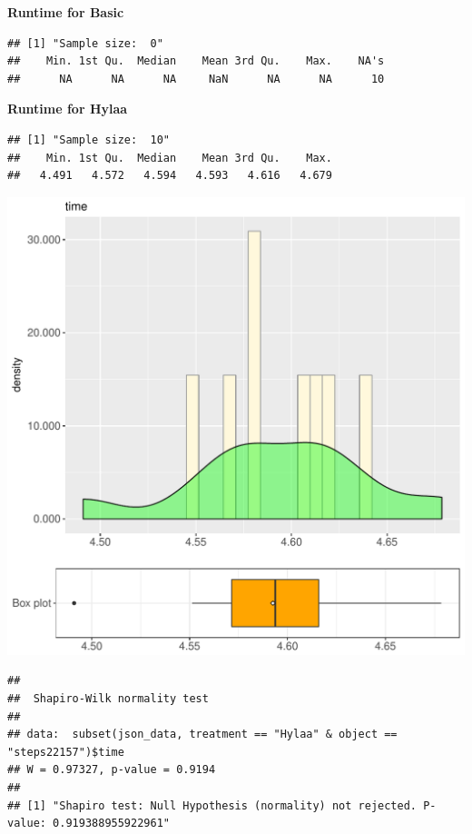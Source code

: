 \documentclass{article}\usepackage[]{graphicx}\usepackage[]{color}
\makeatletter
\def\maxwidth{ %
  \ifdim\Gin@nat@width>\linewidth
    \linewidth
  \else
    \Gin@nat@width
  \fi
}
\newenvironment{kframe}{%
 \def\at@end@of@kframe{}%
 \ifinner\ifhmode%
  \def\at@end@of@kframe{\end{minipage}}%
  \begin{minipage}{\columnwidth}%
 \fi\fi%
 \def\FrameCommand##1{\hskip\@totalleftmargin \hskip-\fboxsep
 \colorbox{shadecolor}{##1}\hskip-\fboxsep
     \hskip-\linewidth \hskip-\@totalleftmargin \hskip\columnwidth}%
 \MakeFramed {\advance\hsize-\width
   \@totalleftmargin\z@ \linewidth\hsize
   \@setminipage}}%
 {\par\unskip\endMakeFramed%
 \at@end@of@kframe}
\newenvironment{knitrout}{}{} %
\makeatother
\begin{document}
 \textbf{Runtime for Basic}
\begin{knitrout}
\color{fgcolor}\begin{kframe}
\begin{verbatim}
## [1] "Sample size:  0"
##    Min. 1st Qu.  Median    Mean 3rd Qu.    Max.    NA's 
##      NA      NA      NA     NaN      NA      NA      10
\end{verbatim}
\end{kframe}
\end{knitrout}
 \textbf{Runtime for Hylaa}
\begin{knitrout}
\color{fgcolor}\begin{kframe}
\begin{verbatim}
## [1] "Sample size:  10"
##    Min. 1st Qu.  Median    Mean 3rd Qu.    Max. 
##   4.491   4.572   4.594   4.593   4.616   4.679
\end{verbatim}
\end{kframe}
\includegraphics[width=\maxwidth]{figure/RH3_Hylaa_steps22157-1} 
\begin{kframe}\begin{verbatim}
## 
## 	Shapiro-Wilk normality test
## 
## data:  subset(json_data, treatment == "Hylaa" & object == "steps22157")$time
## W = 0.97327, p-value = 0.9194
## 
## [1] "Shapiro test: Null Hypothesis (normality) not rejected. P-value: 0.919388955922961"
\end{verbatim}
\end{kframe}
\end{knitrout}
  
\end{document}
